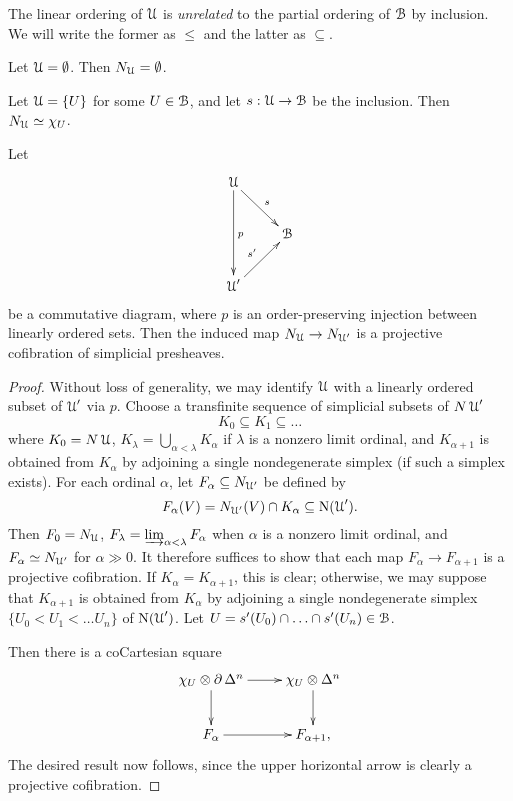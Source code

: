 \begin{remark}
The linear ordering of $\operatorname{\mathcal{U}}$ is {\em unrelated} to the partial ordering of $\operatorname{\mathcal{B}}$ by inclusion.
We will write the former as $\leq$ and the latter as $\subseteq$.
\end{remark}

\begin{example}
Let $\operatorname{\mathcal{U}} = \emptyset$. Then $N_{\operatorname{\mathcal{U}}} = \emptyset$.
\end{example}

\begin{example}
Let $\operatorname{\mathcal{U}} = \{ U\}$ for some $U \in \operatorname{\mathcal{B}}$, and let $s: \operatorname{\mathcal{U}} \rightarrow \operatorname{\mathcal{B}}$ be the inclusion. Then $N_{\operatorname{\mathcal{U}}} \simeq \chi_{U}$.
\end{example}

\begin{proposition}\label{murkminus}
Let $$ \xymatrix{ \calU \ar[dd]^{p} \ar[dr]^{s} & \\
& \calB \\
\calU' \ar[ur]^{s'} & }$$
be a commutative diagram, where $p$ is an order-preserving injection between linearly ordered sets. Then the induced map $N_{\operatorname{\mathcal{U}}} \rightarrow N_{\operatorname{\mathcal{U}}'}$ is a projective cofibration of simplicial presheaves.
\end{proposition}

\begin{proof}
Without loss of generality, we may identify $\operatorname{\mathcal{U}}$ with a linearly ordered subset of $\operatorname{\mathcal{U}}'$ via $p$. Choose a transfinite sequence of simplicial subsets of $N \operatorname{\mathcal{U}}'$ 
$$ K_0 \subseteq K_1 \subseteq \ldots$$
where $K_0 = N \operatorname{\mathcal{U}}$, $K_{\lambda} = \bigcup_{\alpha < \lambda} K_{\alpha}$ if $\lambda$ is a nonzero limit ordinal, and $K_{\alpha+1}$ is obtained from $K_{\alpha}$ by adjoining a single nondegenerate simplex (if such a simplex exists). For each ordinal $\alpha$, let
$F_{\alpha} \subseteq N_{\operatorname{\mathcal{U}}'}$ be defined by
$$ F_{\alpha}(V) = N_{\operatorname{\mathcal{U}}'}(V) \cap K_{\alpha} \subseteq \operatorname{N}(\operatorname{\mathcal{U}}'). $$
Then $F_0 = N_{\operatorname{\mathcal{U}}}$, $F_{\lambda} = \operatorname{\varinjlim}_{\alpha < \lambda} F_{\alpha}$ when $\alpha$ is a nonzero limit ordinal, and $F_{\alpha} \simeq N_{\operatorname{\mathcal{U}}'}$ for $\alpha \gg 0$. It therefore suffices to show that each map $F_{\alpha} \rightarrow F_{\alpha+1}$ is a projective cofibration. If
$K_{\alpha} = K_{\alpha+1}$, this is clear; otherwise, we may suppose that $K_{\alpha+1}$ is obtained from $K_{\alpha}$ by adjoining a single nondegenerate simplex $\{ U_0 < U_1 < \ldots U_{n} \}$ of $\operatorname{N}(\operatorname{\mathcal{U}}')$. Let $U = s'(U_0) \cap \ldots \cap s'(U_n) \in \operatorname{\mathcal{B}}$. 

Then there is a coCartesian square
$$ \xymatrix{ \chi_{U} \otimes \bd \Delta^n \ar[r] \ar[d] & \chi_U \otimes \Delta^n \ar[d] \\
F_{\alpha} \ar[r] & F_{\alpha+1}, }$$
The desired result now follows, since the upper horizontal arrow is clearly a projective cofibration.
\end{proof}

